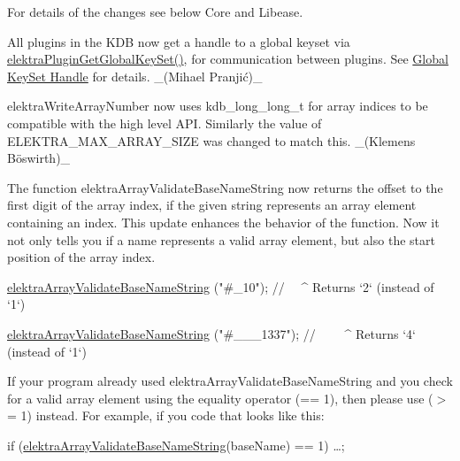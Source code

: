 For details of the changes see below {\ttfamily Core} and {\ttfamily Libease}.


\begin{DoxyItemize}
\item All plugins in the K\+DB now get a handle to a global keyset via {\ttfamily \hyperlink{group__plugin_ga436cda13ed70c0face08661a90620bf6}{elektra\+Plugin\+Get\+Global\+Key\+Set()}}, for communication between plugins. See \hyperlink{doc_decisions_global_keyset_md}{Global Key\+Set Handle} for details. \+\_\+(Mihael Pranjić)\+\_\+
\item {\ttfamily elektra\+Write\+Array\+Number} now uses {\ttfamily kdb\+\_\+long\+\_\+long\+\_\+t} for array indices to be compatible with the high level A\+PI. Similarly the value of {\ttfamily E\+L\+E\+K\+T\+R\+A\+\_\+\+M\+A\+X\+\_\+\+A\+R\+R\+A\+Y\+\_\+\+S\+I\+ZE} was changed to match this. \+\_\+(Klemens Böswirth)\+\_\+
\end{DoxyItemize}


\begin{DoxyItemize}
\item The function {\ttfamily elektra\+Array\+Validate\+Base\+Name\+String} now returns the offset to the first digit of the array index, if the given string represents an array element containing an index. This update enhances the behavior of the function. Now it not only tells you if a name represents a valid array element, but also the start position of the array index.
\end{DoxyItemize}


\begin{DoxyCode}
\hyperlink{array_8c_ab2eb25a64ded91feb47e58af8e62314a}{elektraArrayValidateBaseNameString} (\textcolor{stringliteral}{"#\_10"});
\textcolor{comment}{//                                     ~~^ Returns `2` (instead of `1`)}

\hyperlink{array_8c_ab2eb25a64ded91feb47e58af8e62314a}{elektraArrayValidateBaseNameString} (\textcolor{stringliteral}{"#\_\_\_1337"});
\textcolor{comment}{//                                   ~~~~^ Returns `4` (instead of `1`)}
\end{DoxyCode}


If your program already used {\ttfamily elektra\+Array\+Validate\+Base\+Name\+String} and you check for a valid array element using the equality operator ({\ttfamily == 1}), then please use ({\ttfamily $>$= 1}) instead. For example, if you code that looks like this\+:


\begin{DoxyCode}
\textcolor{keywordflow}{if} (\hyperlink{array_8c_ab2eb25a64ded91feb47e58af8e62314a}{elektraArrayValidateBaseNameString}(baseName) == 1) …;
\end{DoxyCode}


